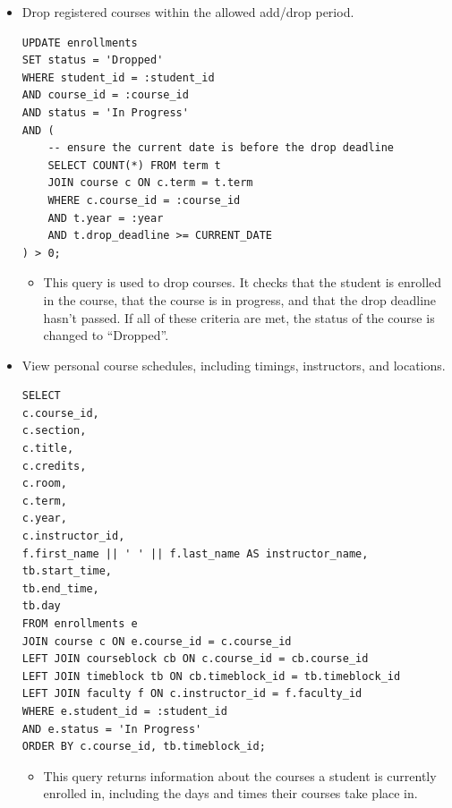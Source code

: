 \documentclass{report}
\begin{document}
\begin{itemize}
    \item Drop registered courses within the allowed add/drop period.
    \begin{lstlisting}
UPDATE enrollments
SET status = 'Dropped'
WHERE student_id = :student_id
AND course_id = :course_id
AND status = 'In Progress'
AND (
    -- ensure the current date is before the drop deadline
    SELECT COUNT(*) FROM term t
    JOIN course c ON c.term = t.term
    WHERE c.course_id = :course_id
    AND t.year = :year
    AND t.drop_deadline >= CURRENT_DATE
) > 0;
    \end{lstlisting}
    \begin{itemize}
        \item This query is used to drop courses. It checks that the student is enrolled in the course, that the course is in progress, and that the drop deadline hasn't passed. If all of these criteria are met, the status of the course is changed to ``Dropped''.
    \end{itemize}

    \item View personal course schedules, including timings, instructors, and locations.
    \begin{lstlisting}
SELECT
c.course_id,
c.section,
c.title,
c.credits,
c.room,
c.term,
c.year,
c.instructor_id,
f.first_name || ' ' || f.last_name AS instructor_name,
tb.start_time,
tb.end_time,
tb.day
FROM enrollments e
JOIN course c ON e.course_id = c.course_id
LEFT JOIN courseblock cb ON c.course_id = cb.course_id
LEFT JOIN timeblock tb ON cb.timeblock_id = tb.timeblock_id
LEFT JOIN faculty f ON c.instructor_id = f.faculty_id
WHERE e.student_id = :student_id
AND e.status = 'In Progress'
ORDER BY c.course_id, tb.timeblock_id;
    \end{lstlisting}
    \begin{itemize}
        \item This query returns information about the courses a student is currently enrolled in, including the days and times their courses take place in.
    \end{itemize}
    

\end{itemize}
\end{document}
